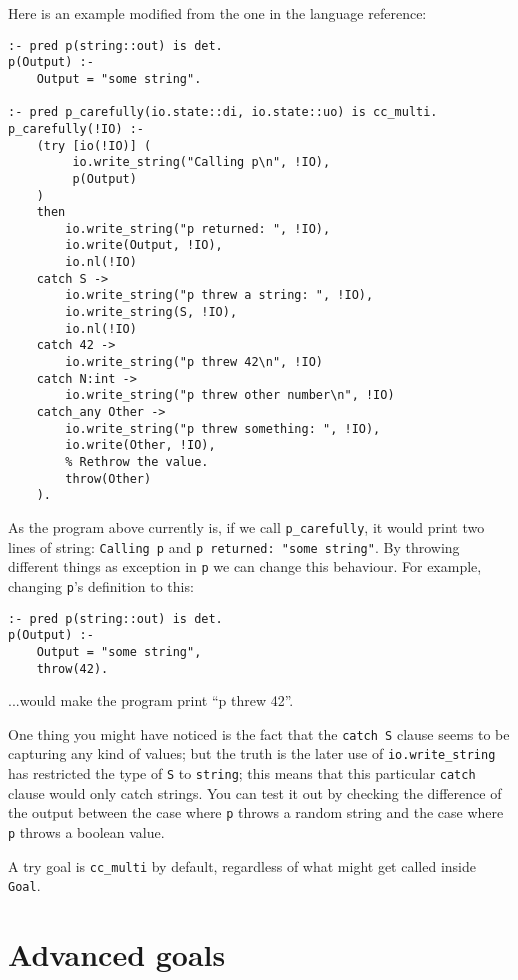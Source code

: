 Here is an example modified from the one in the language reference:

\begin{lstlisting}[language=Mercury]
:- pred p(string::out) is det.
p(Output) :-
	Output = "some string".

:- pred p_carefully(io.state::di, io.state::uo) is cc_multi.
p_carefully(!IO) :-
    (try [io(!IO)] (
         io.write_string("Calling p\n", !IO),
		 p(Output)
    )
    then
        io.write_string("p returned: ", !IO),
        io.write(Output, !IO),
        io.nl(!IO)
    catch S ->
        io.write_string("p threw a string: ", !IO),
        io.write_string(S, !IO),
        io.nl(!IO)
    catch 42 ->
        io.write_string("p threw 42\n", !IO)
    catch N:int ->
	    io.write_string("p threw other number\n", !IO)
    catch_any Other ->
        io.write_string("p threw something: ", !IO),
        io.write(Other, !IO),
        % Rethrow the value.
        throw(Other)
    ).
\end{lstlisting}

As the program above currently is, if we call \texttt{p_carefully}, it would print two lines of string: \texttt{Calling p} and \texttt{p returned: "some string"}. By throwing different things as exception in \texttt{p} we can change this behaviour. For example, changing \texttt{p}'s definition to this:

\begin{lstlisting}[language=Mercury]
:- pred p(string::out) is det.
p(Output) :-
	Output = "some string",
	throw(42).
\end{lstlisting}

...would make the program print ``p threw 42''.

One thing you might have noticed is the fact that the \texttt{catch S} clause seems to be capturing any kind of values; but the truth is the later use of \texttt{io.write_string} has restricted the type of \texttt{S} to \texttt{string}; this means that this particular \texttt{catch} clause would only catch strings. You can test it out by checking the difference of the output between the case where \texttt{p} throws a random string and the case where \texttt{p} throws a boolean value.

A try goal is \texttt{cc_multi} by default, regardless of what might get called inside \texttt{Goal}.

\section{Advanced goals}

